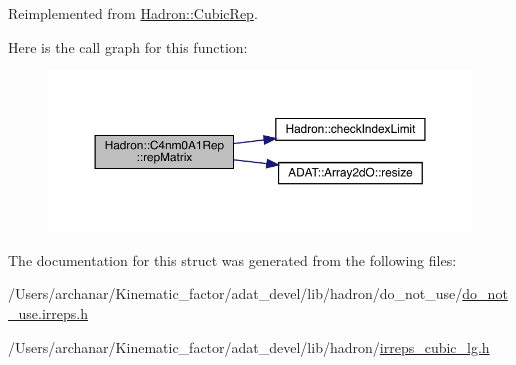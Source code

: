 Reimplemented from \mbox{\hyperlink{structHadron_1_1CubicRep_ac5d7e9e6f4ab1158b5fce3e4ad9e8005}{Hadron\+::\+Cubic\+Rep}}.

Here is the call graph for this function\+:
\nopagebreak
\begin{figure}[H]
\begin{center}
\leavevmode
\includegraphics[width=350pt]{d8/d28/structHadron_1_1C4nm0A1Rep_a18af771ed96478090f052459dd7a70da_cgraph}
\end{center}
\end{figure}


The documentation for this struct was generated from the following files\+:\begin{DoxyCompactItemize}
\item 
/\+Users/archanar/\+Kinematic\+\_\+factor/adat\+\_\+devel/lib/hadron/do\+\_\+not\+\_\+use/\mbox{\hyperlink{do__not__use_8irreps_8h}{do\+\_\+not\+\_\+use.\+irreps.\+h}}\item 
/\+Users/archanar/\+Kinematic\+\_\+factor/adat\+\_\+devel/lib/hadron/\mbox{\hyperlink{lib_2hadron_2irreps__cubic__lg_8h}{irreps\+\_\+cubic\+\_\+lg.\+h}}\end{DoxyCompactItemize}
